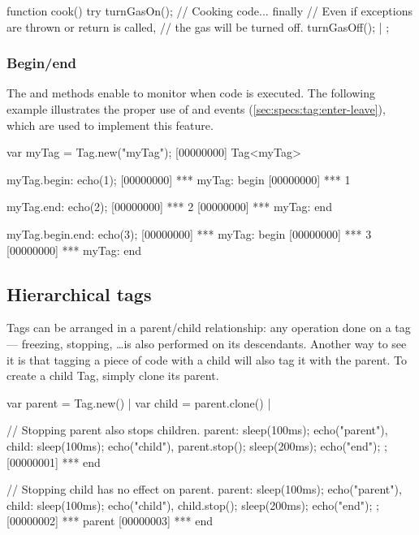 \begin{urbiscript}
{
  function cook()
  {
    try
    {
      turnGasOn();
      // Cooking code...
    }
    finally
    {
      // Even if exceptions are thrown or return is called,
      // the gas will be turned off.
      turnGasOff();
    }
  }|
};
\end{urbiscript}

\subsubsection{Begin/end}
\label{sec:specs:tag:begin-end}

The  and  methods enable to monitor when code is
executed.  The following example illustrates the proper use of
 and  events
(\autoref{sec:specs:tag:enter-leave}), which are used to implement this
feature.

\begin{urbiscript}
var myTag = Tag.new("myTag");
[00000000] Tag<myTag>

myTag.begin: echo(1);
[00000000] *** myTag: begin
[00000000] *** 1

myTag.end: echo(2);
[00000000] *** 2
[00000000] *** myTag: end

myTag.begin.end: echo(3);
[00000000] *** myTag: begin
[00000000] *** 3
[00000000] *** myTag: end
\end{urbiscript}

\subsection{Hierarchical tags}

Tags can be arranged in a parent/child relationship: any operation done on a
tag --- freezing, stopping, \ldots is also performed on its descendants.
Another way to see it is that tagging a piece of code with a child will also
tag it with the parent. To create a child Tag, simply clone its parent.

\begin{urbiscript}
var parent = Tag.new() |
var child = parent.clone() |

// Stopping parent also stops children.
{
  parent: {sleep(100ms); echo("parent")},
  child:  {sleep(100ms); echo("child")},
  parent.stop();
  sleep(200ms);
  echo("end");
};
[00000001] *** end

// Stopping child has no effect on parent.
{
  parent: {sleep(100ms); echo("parent")},
  child:  {sleep(100ms); echo("child")},
  child.stop();
  sleep(200ms);
  echo("end");
};
[00000002] *** parent
[00000003] *** end
\end{urbiscript}


